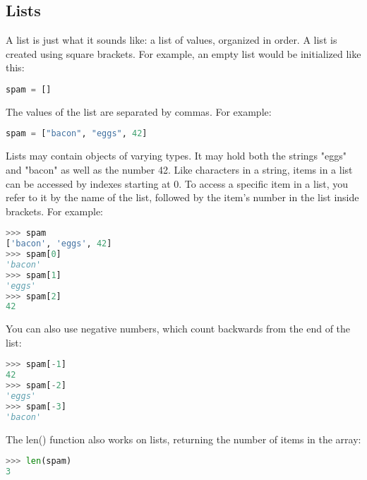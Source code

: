 \subsection{Lists}
A list is just what it sounds like: a list of values, organized in order. A list
is created using square brackets. For example, an empty list would be
initialized like this:
\lstset{basicstyle=\scriptsize, numbers=left, captionpos=b, tabsize=4}
\begin{lstlisting}[caption=List Definition 1,language={Python},
xleftmargin=15pt, label=lst:listdefinition1]
spam = []
\end{lstlisting}

The values of the list are separated by commas. For example:
\lstset{basicstyle=\scriptsize, numbers=left, captionpos=b, tabsize=4}
\begin{lstlisting}[caption=List Definition 2,language={Python},
xleftmargin=15pt, label=lst:listdefinition2]
spam = ["bacon", "eggs", 42]
\end{lstlisting}

Lists may contain objects of varying types. It may hold both the strings "eggs"
and "bacon" as well as the number 42.  Like characters in a string, items in a
list can be accessed by indexes starting at 0. To access a specific item in a
list, you refer to it by the name of the list, followed by the item's number in
the list inside brackets. For example:
\lstset{basicstyle=\scriptsize, numbers=left, captionpos=b, tabsize=4}
\begin{lstlisting}[caption=List Definition 3,language={Python},
xleftmargin=15pt, label=lst:listdefinition3]
>>> spam
['bacon', 'eggs', 42]
>>> spam[0]
'bacon'
>>> spam[1]
'eggs'
>>> spam[2]
42
\end{lstlisting}

You can also use negative numbers, which count backwards from the end of the list:
\lstset{basicstyle=\scriptsize, numbers=left, captionpos=b, tabsize=4}
\begin{lstlisting}[caption=List negativ Index,language={Python},
xleftmargin=15pt, label=lst:listnegativindex]
>>> spam[-1]
42
>>> spam[-2]
'eggs'
>>> spam[-3]
'bacon'
\end{lstlisting}

The len() function also works on lists, returning the number of items in the array:
\lstset{basicstyle=\scriptsize, numbers=left, captionpos=b, tabsize=4}
\begin{lstlisting}[caption=len Function List,language={Python},
xleftmargin=15pt, label=lst:lenfunctionlist]
>>> len(spam)
3
\end{lstlisting}

